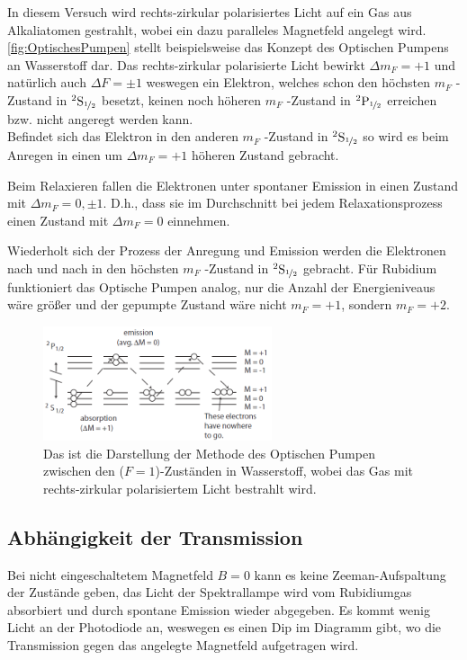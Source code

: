         In diesem Versuch wird rechts-zirkular polarisiertes Licht auf ein Gas aus Alkaliatomen gestrahlt, wobei ein dazu paralleles Magnetfeld angelegt wird. \autoref{fig:OptischesPumpen} stellt beispielsweise das Konzept des Optischen Pumpens an Wasserstoff dar. Das rechts-zirkular polarisierte Licht bewirkt $\Delta m_F = +1$ und natürlich auch $\Delta F = \pm 1$ weswegen ein Elektron, welches schon den höchsten $m_F$ -Zustand in $^2\text{S}_{\nicefrac{1}{2}}$ besetzt, keinen noch höheren $m_F$ -Zustand in $^2\text{P}_{\nicefrac{1}{2}}$ erreichen bzw. nicht angeregt werden kann.\\
        Befindet sich das Elektron in den anderen $m_F$ -Zustand in $^2\text{S}_{\nicefrac{1}{2}}$ so wird es beim Anregen in einen um $\Delta m_F = +1$ höheren Zustand gebracht.

        Beim Relaxieren fallen die Elektronen unter spontaner Emission in einen Zustand mit $\Delta m_F = 0, \pm 1$. D.h., dass sie im Durchschnitt bei jedem Relaxationsprozess einen Zustand mit $\Delta m_F = 0$ einnehmen.

        Wiederholt sich der Prozess der Anregung und Emission werden die Elektronen nach und nach in den höchsten $m_F$ -Zustand in $^2\text{S}_{\nicefrac{1}{2}}$ gebracht. Für Rubidium funktioniert das Optische Pumpen analog, nur die Anzahl der Energieniveaus wäre größer und der gepumpte Zustand wäre nicht $m_F = +1$, sondern $m_F = +2$.
    
        \begin{figure}
            \centering
            \includegraphics[width = 0.6\textwidth]{pictures/OptischesPumpen.png}
            \caption{Das ist die Darstellung der Methode des Optischen Pumpen zwischen den ($F=1$)-Zuständen in Wasserstoff, wobei das Gas mit rechts-zirkular polarisiertem Licht bestrahlt wird.}
            \label{fig:OptischesPumpen}
        \end{figure}

        \FloatBarrier

    \subsection{Abhängigkeit der Transmission}
        Bei nicht eingeschaltetem Magnetfeld $B = 0$ kann es keine Zeeman-Aufspaltung der Zustände geben, das Licht der Spektrallampe wird vom Rubidiumgas absorbiert und durch spontane Emission wieder abgegeben. Es kommt wenig Licht an der Photodiode an, weswegen es einen Dip im Diagramm gibt, wo die Transmission gegen das angelegte Magnetfeld aufgetragen wird.


